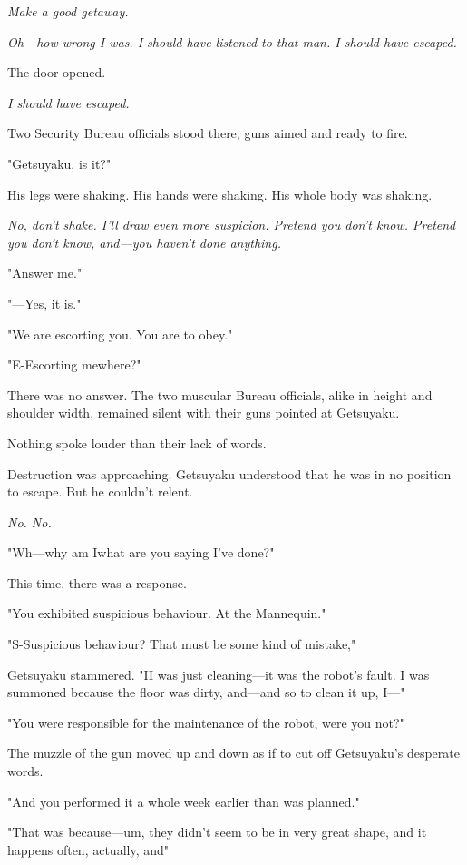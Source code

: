 \emph{Make a good getaway.}

\emph{Oh---how wrong I was. I should have listened to that man. I should have
escaped.}

The door opened.

\emph{I should have escaped.}

Two Security Bureau officials stood there, guns aimed and ready to fire.

"Getsuyaku, is it?"

His legs were shaking. His hands were shaking. His whole body was
shaking.

\emph{No, don't shake. I'll draw even more suspicion. Pretend you don't know.
Pretend you don't know, and---you haven't done anything.}

"Answer me."

"---Yes, it is."

"We are escorting you. You are to obey."

\mybreak

"E-Escorting me\el where?"

There was no answer. The two muscular Bureau officials, alike in height
and shoulder width, remained silent with their guns pointed at
Getsuyaku.

Nothing spoke louder than their lack of words.

Destruction was approaching. Getsuyaku understood that he was in no
position to escape. But he couldn't relent.

\emph{No. No.}

"Wh---why am I\el what are you saying I've done\el ?"~

This time, there was a response.

"You exhibited suspicious behaviour. At the Mannequin."

"S-Suspicious behaviour? That must be some kind of mistake,"~

Getsuyaku stammered. "I\el I was just cleaning---it was the robot's fault.
I was summoned because the floor was dirty, and---and so to clean it up,
I---"

"You were responsible for the maintenance of the robot, were you not?"

The muzzle of the gun moved up and down as if to cut off Getsuyaku's
desperate words.

"And you performed it a whole week earlier than was planned."

"That was because---um, they didn't seem to be in very great shape, and\el 
it happens often, actually, and\el "

